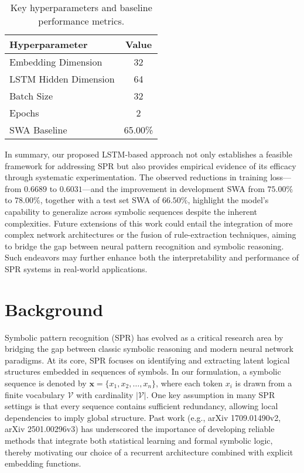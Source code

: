 \documentclass{article}
\begin{document}
\begin{table}[h]
\centering
\begin{tabular}{|l|c|}
\hline
\textbf{Hyperparameter} & \textbf{Value}\\ \hline
Embedding Dimension    & 32       \\ \hline
LSTM Hidden Dimension  & 64       \\ \hline
Batch Size             & 32       \\ \hline
Epochs                 & 2        \\ \hline
SWA Baseline           & 65.00\% \\ \hline
\end{tabular}
\caption{Key hyperparameters and baseline performance metrics.}
\label{tab:params}
\end{table}

In summary, our proposed LSTM-based approach not only establishes a feasible framework for addressing SPR but also provides empirical evidence of its efficacy through systematic experimentation. The observed reductions in training loss—from $0.6689$ to $0.6031$—and the improvement in development SWA from $75.00\%$ to $78.00\%$, together with a test set SWA of $66.50\%$, highlight the model's capability to generalize across symbolic sequences despite the inherent complexities. Future extensions of this work could entail the integration of more complex network architectures or the fusion of rule-extraction techniques, aiming to bridge the gap between neural pattern recognition and symbolic reasoning. Such endeavors may further enhance both the interpretability and performance of SPR systems in real-world applications.

\section{Background}
Symbolic pattern recognition (SPR) has evolved as a critical research area by bridging the gap between classic symbolic reasoning and modern neural network paradigms. At its core, SPR focuses on identifying and extracting latent logical structures embedded in sequences of symbols. In our formulation, a symbolic sequence is denoted by \( \mathbf{x} = \{x_1, x_2, \dots, x_n\} \), where each token \( x_i \) is drawn from a finite vocabulary \( \mathcal{V} \) with cardinality \(|\mathcal{V}|\). One key assumption in many SPR settings is that every sequence contains sufficient redundancy, allowing local dependencies to imply global structure. Past work (e.g., arXiv 1709.01490v2, arXiv 2501.00296v3) has underscored the importance of developing reliable methods that integrate both statistical learning and formal symbolic logic, thereby motivating our choice of a recurrent architecture combined with explicit embedding functions.
\end{document}
